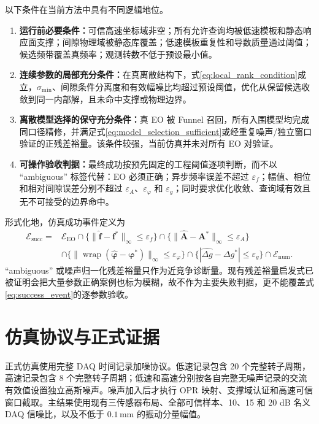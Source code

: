 \documentclass[UTF8,12pt,a4paper]{ctexart}
\begin{document}
以下条件在当前方法中具有不同逻辑地位。
\begin{enumerate}
  \item \textbf{运行前必要条件：}可信高速坐标域非空；所有允许查询均被低速模板和静态响应面支撑；间隙物理域被静态库覆盖；低速模板重复性和导数质量通过阈值；候选频带覆盖真频率；观测转数不低于预设最小值。
  \item \textbf{连续参数的局部充分条件：}在真离散结构下，式\eqref{eq:local_rank_condition}成立，$\sigma_{\min}$、间隙条件分离度和有效幅噪比均超过预设阈值，优化从保留候选收敛到同一内部解，且未命中支撑或物理边界。
  \item \textbf{离散模型选择的保守充分条件：}真 EO 被 Funnel 召回，所有入围模型均完成同口径精修，并满足式\eqref{eq:model_selection_sufficient}或经重复噪声/独立窗口验证的正残差裕量。该条件较强，当前仿真并未对所有 EO 对验证。
  \item \textbf{可操作验收判据：}最终成功按预先固定的工程阈值逐项判断，而不以 ``ambiguous'' 标签代替：EO 必须正确；异步频率误差不超过 $\varepsilon_f$；幅值、相位和相对间隙误差分别不超过 $\varepsilon_A$、$\varepsilon_\varphi$ 和 $\varepsilon_g$；同时要求优化收敛、查询域有效且无不可接受的边界命中。
\end{enumerate}
形式化地，仿真成功事件定义为
\begin{equation}
\begin{aligned}
\mathcal E_{\mathrm{succ}}
={}&\mathcal E_{\mathrm{EO}}
\cap\{\|\widehat{\bm f}-\bm f^*\|_\infty\leq\varepsilon_f\}
\cap\{\|\widehat{\bm A}-\bm A^*\|_\infty\leq\varepsilon_A\}\\
&\cap\{\|\operatorname{wrap}(\widehat{\bm\varphi}-\bm\varphi^*)\|_\infty\leq\varepsilon_\varphi\}
\cap\{|\widehat{\Delta g}-\Delta g^*|\leq\varepsilon_g\}
\cap\mathcal E_{\mathrm{num}}.
\end{aligned}
\label{eq:success_event}
\end{equation}
``ambiguous'' 或噪声归一化残差裕量只作为近竞争诊断量。现有残差裕量启发式已被证明会把大量参数正确案例也标为模糊，故不作为主要失败判据，更不能覆盖式\eqref{eq:success_event}的逐参数验收。

\section{仿真协议与正式证据}

正式仿真使用完整 DAQ 时间记录加噪协议。低速记录包含 20 个完整转子周期，高速记录包含 8 个完整转子周期；低速和高速分别按各自完整无噪声记录的交流有效值设置独立高斯噪声。噪声加入后才执行 OPR 映射、支撑域认证和高速可信窗口截取。主结果使用现有三传感器布局、全部可信样本、10、15 和 20 dB 名义 DAQ 信噪比，以及不低于 $0.1\,\mathrm{mm}$ 的振动分量幅值。
\end{document}
